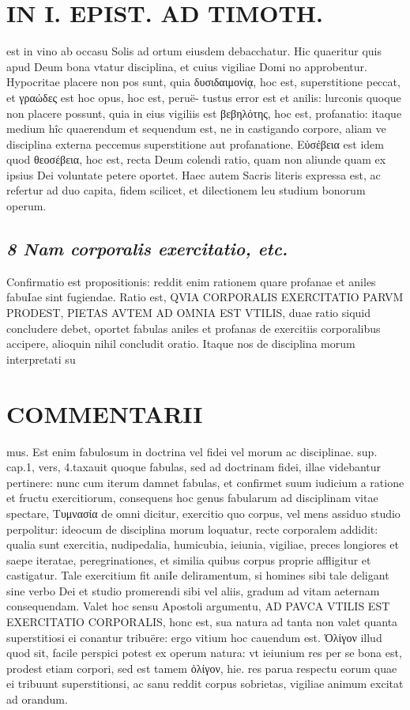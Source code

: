 \documentclass{article}
\begin{document}
\begin{pages}
\section*{IN I. EPIST. AD TIMOTH. }
\marginpar{[ p.97 ]}
\marginpar{[ p.G ]}\pstart est in vino ab occasu Solis ad ortum eiusdem debacchatur. Hic quaeritur quis apud Deum bona vtatur disciplina, et cuius vigiliae Domi no approbentur. Hypocritae placere non pos sunt, quia δυσιδαιμονίᾳ, hoc est, superstitione peccat, et γραώδες est hoc opus, hoc est, peruë- tustus error est et anilis: lurconis quoque non placere possunt, quia in eius vigiliis est βεβηλότης, hoc est, profanatio: itaque medium hîc quaerendum et sequendum est, ne in castigando corpore, aliam ve disciplina externa peccemus superstitione aut profanatione. Εὐσέβεια est idem quod θεοσέβεια, hoc est, recta Deum colendi ratio, quam non aliunde quam ex ipsius Dei voluntate petere oportet. Haec autem Sacris literis expressa est, ac refertur ad duo capita, fidem scilicet, et dilectionem leu studium bonorum operum.  \pend
{}
{}
\subsection*{\textit{8 Nam corporalis exercitatio, etc. }}\pstart Confirmatio est propositionis: reddit enim rationem quare profanae et aniles fabuIae sint fugiendae. Ratio est, QVIA CORPORALIS EXERCITATIO PARVM PRODEST, PIETAS AVTEM AD OMNIA EST VTILIS, duae ratio siquid concludere debet, oportet fabulas aniles et profanas de exercitiis corporalibus accipere, alioquin nihil concludit oratio. Itaque nos de disciplina morum interpretati su\pend
\section*{COMMENTARII }
\marginpar{[ p.98 ]}\pstart mus. Est enim fabulosum in doctrina vel fidei vel morum ac disciplinae. sup. cap.1, vers, 4.taxauit quoque fabulas, sed ad doctrinam fidei, illae videbantur pertinere: nunc cum iterum damnet fabulas, et confirmet suum iudicium a ratione et fructu exercitiorum, consequens hoc genus fabularum ad disciplinam vitae spectare, Τυμνασία de omni dicitur, exercitio quo corpus, vel mens assiduo studio perpolitur: ideocum de disciplina morum loquatur, recte corporalem addidit: qualia sunt exercitia, nudipedalia, humicubia, ieiunia, vigiliae, preces longiores et saepe iteratae, peregrinationes, et similia quibus corpus proprie affligitur et castigatur. Tale exercitium fit aniIe deliramentum, si homines sibi tale deligant sine verbo Dei et studio promerendi sibi vel aliis, gradum ad vitam aeternam consequendam. Valet hoc sensu Apostoli argumentu, AD PAVCA VTILIS EST EXERCITATIO CORPORALIS, honc est, sua natura ad tanta non valet quanta superstitiosi ei conantur tribuëre: ergo vitium hoc cauendum est. Ὀλίγον illud quod sit, facile perspici potest ex operum natura: vt ieiunium res per se bona est, prodest etiam corpori, sed est tamem ὀλίγον, hie. res parua respectu eorum quae ei tribuunt superstitionsi, ac sanu reddit corpus sobrietas, vigiliae animum excitat ad orandum.  \pend

\end{pages}
\end{document}
